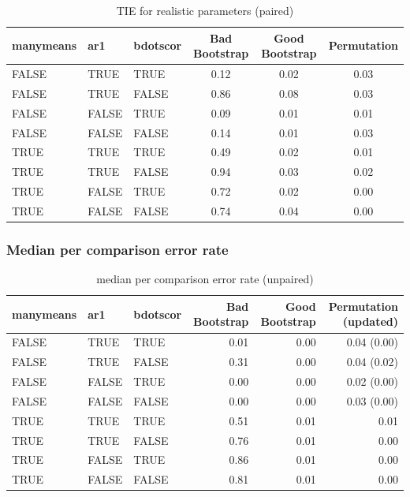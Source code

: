 \documentclass{article}
\begin{document}
\begin{table}[H]
\centering
\begin{tabular}{lllccc}
  \hline
  manymeans & ar1 & bdotscor &  Bad Bootstrap & Good Bootstrap & Permutation \\ 
  \hline
FALSE & TRUE & TRUE & 0.12 & 0.02 & 0.03 \\ 
  FALSE & TRUE & FALSE & 0.86 & 0.08 & 0.03 \\ 
  FALSE & FALSE & TRUE & 0.09 & 0.01 & 0.01 \\ 
  FALSE & FALSE & FALSE & 0.14 & 0.01 & 0.03 \\ 
  TRUE & TRUE & TRUE & 0.49 & 0.02 & 0.01 \\ 
  TRUE & TRUE & FALSE & 0.94 & 0.03 & 0.02 \\ 
  TRUE & FALSE & TRUE & 0.72 & 0.02 & 0.00 \\ 
  TRUE & FALSE & FALSE & 0.74 & 0.04 & 0.00 \\ 
   \hline
\end{tabular}
\caption{TIE for realistic parameters (paired)}
\end{table}

\subsubsection{Median per comparison error rate}

\begin{table}[H]
\centering
\begin{tabular}{lllrrr}
  \hline
  manymeans & ar1 & bdotscor &  Bad Bootstrap & Good Bootstrap & Permutation (updated) \\ 
  \hline
FALSE & TRUE & TRUE & 0.01 & 0.00 & 0.04  (0.00)\\ 
  FALSE & TRUE & FALSE & 0.31 & 0.00 & 0.04  (0.02)\\ 
  FALSE & FALSE & TRUE & 0.00 & 0.00 & 0.02  (0.00)\\ 
  FALSE & FALSE & FALSE & 0.00 & 0.00 & 0.03 (0.00)\\ 
  TRUE & TRUE & TRUE & 0.51 & 0.01 & 0.01 \\ 
  TRUE & TRUE & FALSE & 0.76 & 0.01 & 0.00 \\ 
  TRUE & FALSE & TRUE & 0.86 & 0.01 & 0.00 \\ 
  TRUE & FALSE & FALSE & 0.81 & 0.01 & 0.00 \\ 
   \hline
\end{tabular}
\caption{median per comparison error rate (unpaired)}
\end{table}
\end{document}
